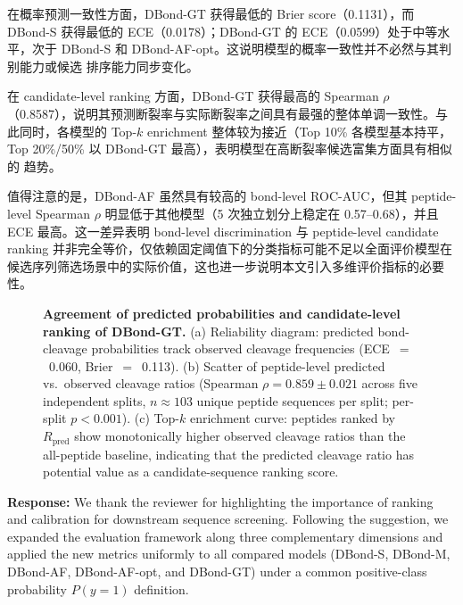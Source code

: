 在概率预测一致性方面，DBond-GT 获得最低的 Brier score（0.1131），而 DBond-S
获得最低的 ECE（0.0178）；DBond-GT 的 ECE（0.0599）处于中等水平，次于
DBond-S 和 DBond-AF-opt。这说明模型的概率一致性并不必然与其判别能力或候选
排序能力同步变化。

在 candidate-level ranking 方面，DBond-GT 获得最高的 Spearman $\rho$
（0.8587），说明其预测断裂率与实际断裂率之间具有最强的整体单调一致性。与
此同时，各模型的 Top-$k$ enrichment 整体较为接近（Top 10\% 各模型基本持平，
Top 20\%/50\% 以 DBond-GT 最高），表明模型在高断裂率候选富集方面具有相似的
趋势。

值得注意的是，DBond-AF 虽然具有较高的 bond-level ROC-AUC，但其 peptide-level
Spearman $\rho$ 明显低于其他模型（5 次独立划分上稳定在 0.57--0.68），并且
ECE 最高。这一差异表明 bond-level discrimination 与 peptide-level candidate
ranking 并非完全等价，仅依赖固定阈值下的分类指标可能不足以全面评价模型在
候选序列筛选场景中的实际价值，这也进一步说明本文引入多维评价指标的必要性。

\begin{figure}[t]
\centering
\caption{\textbf{Agreement of predicted probabilities and candidate-level
ranking of DBond-GT.} (a) Reliability diagram: predicted bond-cleavage
probabilities track observed cleavage frequencies
(ECE~$=$~0.060, Brier~$=$~0.113). (b) Scatter of peptide-level predicted
vs.\ observed cleavage ratios (Spearman $\rho = 0.859 \pm 0.021$ across
five independent splits, $n \approx 103$ unique peptide sequences per
split; per-split $p < 0.001$). (c) Top-$k$ enrichment curve: peptides
ranked by $R_{\text{pred}}$ show monotonically higher observed cleavage
ratios than the all-peptide baseline, indicating that the predicted
cleavage ratio has potential value as a candidate-sequence ranking score.}
\label{fig:ranking}
\end{figure}

%
\textbf{Response:} We thank the reviewer for highlighting the importance of
ranking and calibration for downstream sequence screening. Following the
suggestion, we expanded the evaluation framework along three complementary
dimensions and applied the new metrics uniformly to all compared models
(DBond-S, DBond-M, DBond-AF, DBond-AF-opt, and DBond-GT) under a common
positive-class probability $P(y=1)$ definition.

